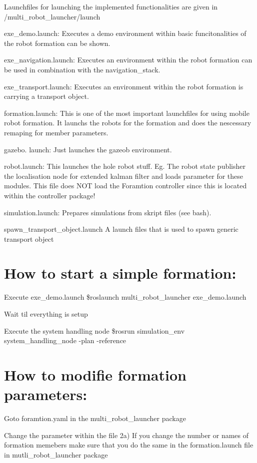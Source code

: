 Launchfiles for launching the implemented functionalities are given in /multi\+\_\+robot\+\_\+launcher/launch
\begin{DoxyEnumerate}
\item exe\+\_\+demo.\+launch\+: Executes a demo environment within basic funcitonalities of the robot formation can be shown.
\item exe\+\_\+navigation.\+launch\+: Executes an environment within the robot formation can be used in combination with the navigation\+\_\+stack.
\item exe\+\_\+transport.\+launch\+: Executes an environment within the robot formation is carrying a transport object.
\item formation.\+launch\+: This is one of the most important launchfiles for using mobile robot formation. It launchs the robots for the formation and does the nescessary remaping for member parameters.
\item gazebo. launch\+: Just launches the gazeob environment.
\item robot.\+launch\+: This launches the hole robot stuff. Eg. The robot state publisher the localisation node for extended kalman filter and loads parameter for these modules. This file does N\+OT load the Foramtion controller since this is located within the controller package!
\item simulation.\+launch\+: Prepares simulations from skript files (see bash).
\item spawn\+\_\+transport\+\_\+object.\+launch A launch files that is used to spawn generic transport object
\end{DoxyEnumerate}

\section*{How to start a simple formation\+:}


\begin{DoxyEnumerate}
\item Execute exe\+\_\+demo.\+launch {\ttfamily \$roslaunch multi\+\_\+robot\+\_\+launcher exe\+\_\+demo.\+launch}
\item Wait til everything is setup
\item Execute the system handling node {\ttfamily \$rosrun simulation\+\_\+env system\+\_\+handling\+\_\+node -\/plan -\/reference}
\end{DoxyEnumerate}

\section*{How to modifie formation parameters\+:}


\begin{DoxyEnumerate}
\item Goto foramtion.\+yaml in the multi\+\_\+robot\+\_\+launcher package
\item Change the parameter within the file 2a) If you change the number or names of formation memebers make sure that you do the same in the formation.\+launch file in mutli\+\_\+robot\+\_\+launcher package 
\end{DoxyEnumerate}
